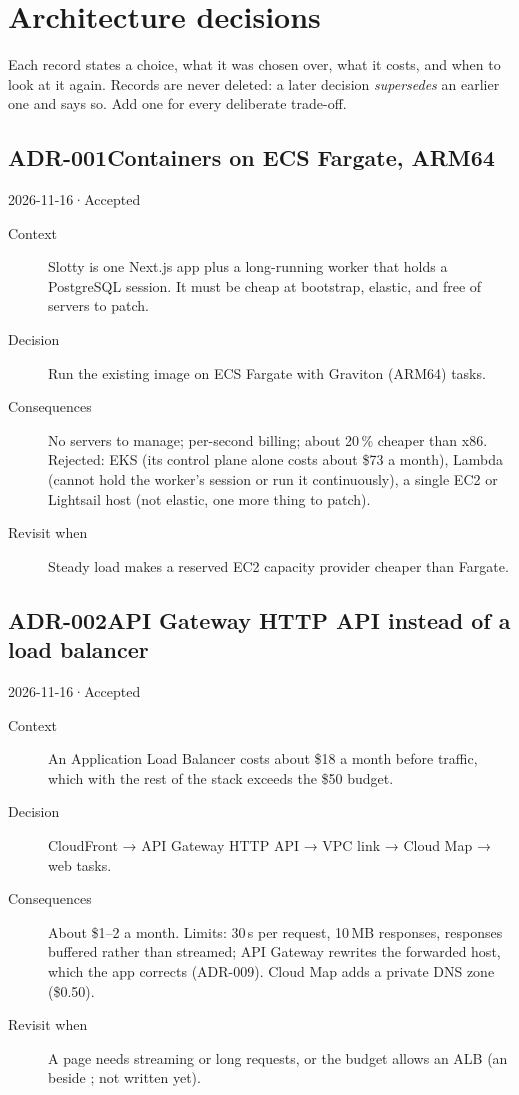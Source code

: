 \chapter{Architecture decisions}\label{ch:decisions}

Each record states a choice, what it was chosen over, what it costs, and when to look at it
again. Records are never deleted: a later decision \emph{supersedes} an earlier one and says so.
Add one for every deliberate trade-off.

\newcommand{\adr}[8]{%
  \section[ADR-#1: #2]{ADR-#1\quad #2}\label{adr:#1}
  {\sffamily\small\color{muted}#3\quad·\quad #4}\par\smallskip
  \begin{description}
    \item[Context] #5
    \item[Decision] #6
    \item[Consequences] #7
    \item[Revisit when] #8
  \end{description}}

\adr{001}{Containers on ECS Fargate, ARM64}{2026-11-16}{Accepted}
  {Slotty is one Next.js app plus a long-running worker that holds a PostgreSQL \code{LISTEN}
   session. It must be cheap at bootstrap, elastic, and free of servers to patch.}
  {Run the existing image on ECS Fargate with Graviton (ARM64) tasks.}
  {No servers to manage; per-second billing; about 20\,\% cheaper than x86. Rejected: EKS (its
   control plane alone costs about \$73 a month), Lambda (cannot hold the worker's session or run
   it continuously), a single EC2 or Lightsail host (not elastic, one more thing to patch).}
  {Steady load makes a reserved EC2 capacity provider cheaper than Fargate.}

\adr{002}{API Gateway HTTP API instead of a load balancer}{2026-11-16}{Accepted}
  {An Application Load Balancer costs about \$18 a month before traffic, which with the rest of the
   stack exceeds the \$50 budget.}
  {CloudFront → API Gateway HTTP API → VPC link → Cloud Map → web tasks.}
  {About \$1–2 a month. Limits: 30\,s per request, 10\,MB responses, responses buffered rather than
   streamed; API Gateway rewrites the forwarded host, which the app corrects (ADR-009). Cloud Map
   adds a private DNS zone (\$0.50).}
  {A page needs streaming or long requests, or the budget allows an ALB (an \code{alb.tf} beside \code{api.tf}; not written yet).}

